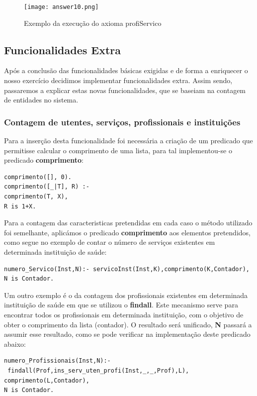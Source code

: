 \begin{figure}[<+htpb+>]
	\centering
	\texttt{[image: answer10.png]}
	\caption{Exemplo da execução do axioma profiServico}
	\label{p3:fig:output10}
\end{figure}

\newpage

\subsection{Funcionalidades Extra}

Após a conclusão das funcionalidades básicas exigidas e de forma a enriquecer o nosso exercício decidimos implementar funcionalidades extra. 
Assim sendo, passaremos a explicar estas novas funcionalidades, que se baseiam na contagem de entidades no sistema. 

\subsubsection{Contagem de utentes, serviços, profissionais e instituições}

Para a inserção desta funcionalidade foi necessária a criação de um predicado que permitisse calcular o comprimento de uma lista, para tal implementou-se o predicado \textbf{comprimento}:
\begin{Verbatim}
comprimento([], 0).
comprimento([_|T], R) :-
comprimento(T, X),
R is 1+X.
\end{Verbatim}

Para a contagem das caracteristicas pretendidas em cada caso o método utilizado foi semelhante, aplicámos o predicado \textbf{comprimento} aos elementos pretendidos, como segue no exemplo de contar o número de serviços existentes em determinada instituição de saúde: 

\begin{Verbatim}
numero_Servico(Inst,N):- servicoInst(Inst,K),comprimento(K,Contador), 
N is Contador.
\end{Verbatim}

Um outro exemplo é o da contagem dos profissionais existentes em determinada instituição de saúde em que se utilizou o \textbf{findall}. Este mecanismo serve para encontrar todos os profissionais em determinada instituição, com o objetivo de obter o comprimento da lista (contador). O resultado será unificado,  \textbf{N} passará a assumir esse resultado, como se pode verificar na implementação deste predicado abaixo:  

\begin{Verbatim}
numero_Profissionais(Inst,N):-
 findall(Prof,ins_serv_uten_profi(Inst,_,_,Prof),L),
comprimento(L,Contador), 
N is Contador.
\end{Verbatim}


